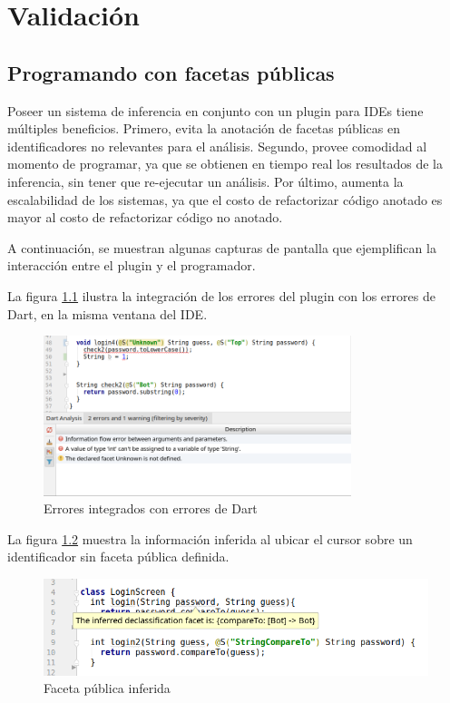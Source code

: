 \chapter{Validación}

\section{Programando con facetas públicas}
Poseer un sistema de inferencia en conjunto con un plugin para IDEs tiene múltiples beneficios. Primero, evita la anotación de facetas públicas en identificadores no relevantes para el análisis. Segundo, provee comodidad al momento de programar, ya que se obtienen en tiempo real los resultados de la inferencia, sin tener que re-ejecutar un análisis. Por último, aumenta la escalabilidad de los sistemas, ya que el costo de refactorizar código anotado es mayor al costo de refactorizar código no anotado.

A continuación, se muestran algunas capturas de pantalla que ejemplifican la interacción entre el plugin y el programador.

La figura \ref{screen1} ilustra la integración de los errores del plugin con los errores de Dart, en la misma ventana del IDE.

\begin{figure}[ht]
  \centering
  \includegraphics[width=0.8\textwidth]{imagenes/screen1.png}
  \caption{Errores integrados con errores de Dart}
  \label{screen1}
\end{figure}
\clearpage

La figura \ref{screen2} muestra la información inferida al ubicar el cursor sobre un identificador sin faceta pública definida.

\begin{figure}[ht]
  \includegraphics[width=\textwidth]{imagenes/facetinfo.png}
  \caption{Faceta pública inferida}
  \label{screen2}
\end{figure}


